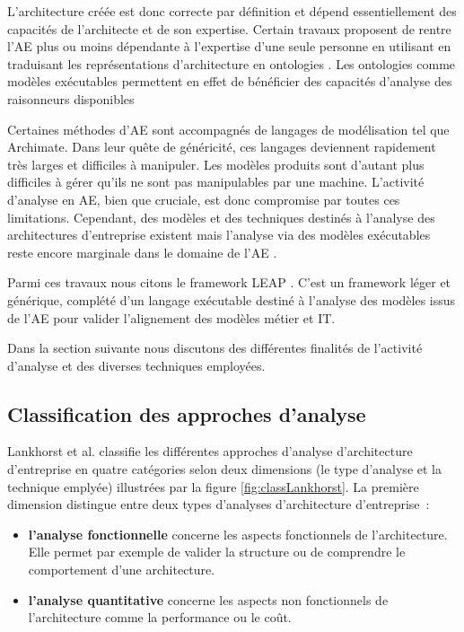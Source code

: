 L'architecture créée est donc correcte par définition et dépend essentiellement des capacités de l'architecte et de son expertise. Certain travaux proposent de rentre l'AE plus ou moins dépendante à l'expertise d'une seule personne en utilisant en traduisant les représentations d'architecture en ontologies \cite{sunkle_analyzing_2013}. Les ontologies comme modèles exécutables permettent en effet de bénéficier des capacités d'analyse des raisonneurs disponibles 

Certaines méthodes d'AE sont accompagnés de langages de modélisation tel que Archimate. Dans leur quête de généricité, ces langages deviennent rapidement très larges et difficiles à manipuler. Les modèles produits sont d'autant plus difficiles à gérer qu'ils ne sont pas manipulables par une machine. L'activité d'analyse en AE, bien que cruciale, est donc compromise par toutes ces limitations. Cependant, des modèles et des techniques destinés à l'analyse des architectures d'entreprise existent mais l'analyse via des modèles exécutables reste encore marginale dans le domaine de l'AE \cite{kulkarni2013modelling}. 

Parmi ces travaux nous citons le framework LEAP \cite{clark2011leap}. C'est un framework léger et générique, complété d'un langage exécutable destiné à l'analyse des modèles issus de l'AE pour valider l'alignement des modèles métier et IT. 

Dans la section suivante nous discutons des différentes finalités de l'activité d'analyse et des diverses techniques employées.


	\subsection{Classification des approches d'analyse}
Lankhorst et al. \cite{lankhorst2009enterprise} classifie les différentes approches d'analyse d'architecture d'entreprise en quatre catégories selon deux dimensions (le type d'analyse et la technique emplyée) illustrées par la figure \ref{fig:classLankhorst}. La première dimension distingue entre deux types d'analyses d'architecture d'entreprise~:
	\begin{itemize}
		\item \textbf{l'analyse fonctionnelle} concerne les aspects fonctionnels de l'architecture. Elle permet par exemple de valider la structure ou de comprendre le comportement d'une architecture.
		\item \textbf{l'analyse quantitative} concerne les aspects non fonctionnels de l'architecture comme la performance ou le coût. 
\end{itemize}

